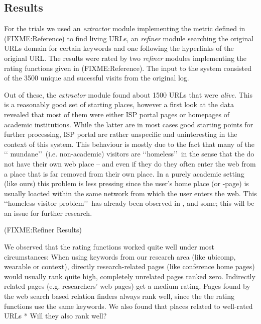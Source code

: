 \documentclass[a4paper]{danarticle}
\theoremstyle{remark}
\begin{document}
{    \subsection{Results}
      For the trials we used an \textit{extractor} module implementing the
      metric defined in (FIXME:Reference) to find living URLs, an
      \textit{refiner} module searching the original URLs domain for certain
      keywords and one following the hyperlinks of the original URL. The results
      were rated by two \textit{refiner} modules implementing the rating
      functions given in (FIXME:Reference). The input to the system consisted of
      the 3500 unique and sucessful visits from the original log.
      
      Out of these, the \textit{extractor} module found about 1500 URLs that
      were \textit{alive}. This is a reasonably good set of starting places,
      however a first look at the data revealed that most of them were either
      ISP portal pages or homepages of academic institutions. While the latter
      are in most cases good starting points for further processing, ISP portal
      are rather unspecific and uninteresting in the context of this system.
      This behaviour is mostly due to the fact that many of the \lq\lq
      mundane\rq\rq\ (i.e. non-academic) visitors are \lq\lq homeless\rq\rq\ in
      the sense that the do not have their own web place -- and even if they do
      they often enter the web from a place that is far removed from their own
      place. In a purely academic setting (like ours) this problem is less
      pressing since the user's home place (or -page) is usually loacted within
      the same network from which the user enters the web. This \lq\lq homeless
      visitor problem\rq\rq\ has already been observed in \cite{webaware}, and 
      some; this will be an issue for further research.
      
      (FIXME:Refiner Results)
      
      We observed that the rating functions worked quite well under most 
      circumstances: When using keywords from our research area (like ubicomp, 
      wearable or context), directly research-related pages (like conference 
      home pages) would usually rank quite high, completely unrelated pages 
      ranked zero. Indirectly related pages (e.g. researchers' web pages)
      get a medium rating. Pages found by the web search based relation finders 
      always rank well, since the the rating functions use the same keywords. We 
      also found that places related to well-rated URLs 
      * Will they also rank well?
}
\end{document}
